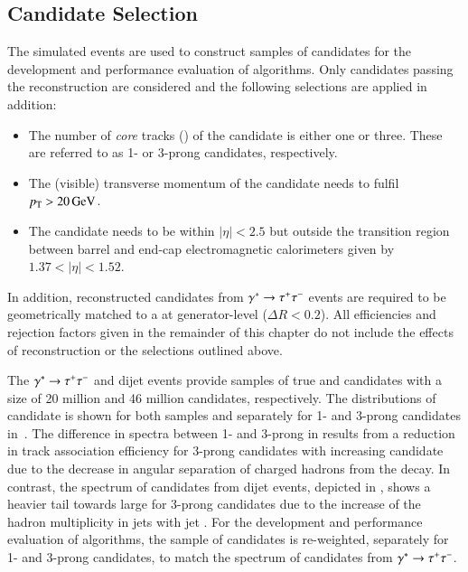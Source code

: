 \subsection{\tauhadvis Candidate Selection}
\label{sec:tauid_candidate_selection}

The simulated events are used to construct samples of \tauhadvis candidates for
the development and performance evaluation of \tauid algorithms. Only candidates
passing the \tauhadvis reconstruction are considered and the following
selections are applied in addition:
\begin{itemize}

\item The number of \emph{core} tracks (\Ntracks) of the \tauhadvis candidate is
  either one or three. These are referred to as 1- or 3-prong \tauhadvis
  candidates, respectively.

\item The (visible) transverse momentum of the candidate needs to
  fulfil $\pT > \SI{20}{\GeV}$.

\item The \tauhadvis candidate needs to be within $|\eta| < 2.5$ but
  outside the transition region between barrel and end-cap
  electromagnetic calorimeters given by $1.37 < |\eta| < 1.52$.

\end{itemize}
In addition, reconstructed \tauhadvis candidates from
$\gamma^{*} \to \tau^{+} \tau^{-}$ events are required to be geometrically
matched to a \tauhad at generator-level ($\Delta R < 0.2$).
All efficiencies and rejection factors given in the remainder of this
chapter do not include the effects of \tauhadvis reconstruction or the
selections outlined above.

The $\gamma^{*} \to \tau^{+} \tau^{-}$ and dijet events provide samples of
true and \faketauhadvis candidates with a size of 20 million and 46 million
candidates, respectively. The distributions of \tauhadvis candidate
\pT is shown for both samples and separately for 1- and 3-prong
candidates in~. The difference in \pT
spectra between 1- and 3-prong \truetauhadvis in
 results from a reduction in
track association efficiency for 3-prong \tauhadvis candidates with
increasing candidate \pT due to the decrease in angular separation of
charged hadrons from the \tauleptonC decay. In contrast, the \pT
spectrum of \tauhadvis candidates from dijet events, depicted in
, shows a heavier tail towards
large \pT for 3-prong candidates due to the increase of the hadron
multiplicity in jets with jet \pT. For the development and performance
evaluation of \tauid algorithms, the sample of \faketauhadvis
candidates is re-weighted, separately for 1- and 3-prong candidates,
to match the \pT spectrum of \truetauhadvis candidates from
$\gamma^{*} \to \tau^{+} \tau^{-}$.

